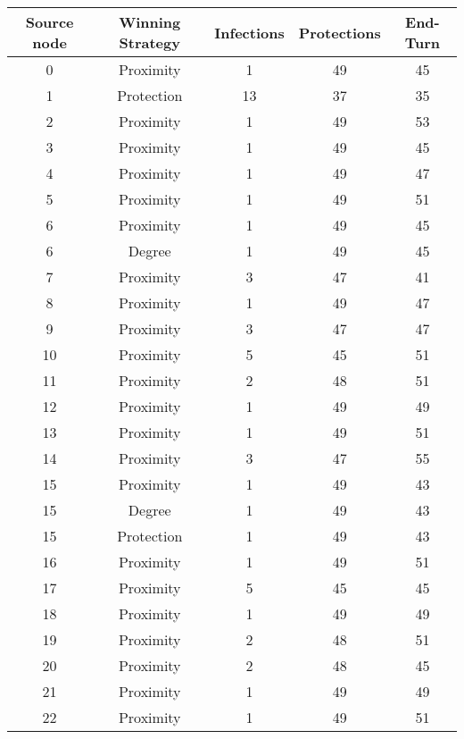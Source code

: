 \documentclass[results.tex]{subfiles}
\begin{document}
\begin{center}
  \begin{tabular}{| c || c | c | c | c |}
    \hline
    {\bfseries Source node} & {\bfseries Winning Strategy} & {\bfseries Infections} & {\bfseries Protections} & {\bfseries End-Turn} \\  %
    \hline\hline
    0 & Proximity & 1 & 49 & 45 \\ 
    \hline
    1 & Protection & 13 & 37 & 35 \\ 
    \hline
    2 & Proximity & 1 & 49 & 53 \\ 
    \hline
    3 & Proximity & 1 & 49 & 45 \\ 
    \hline
    4 & Proximity & 1 & 49 & 47 \\ 
    \hline
    5 & Proximity & 1 & 49 & 51 \\ 
    \hline
    6 & Proximity & 1 & 49 & 45 \\ 
    \hline
    6 & Degree & 1 & 49 & 45 \\ 
    \hline
    7 & Proximity & 3 & 47 & 41 \\ 
    \hline
    8 & Proximity & 1 & 49 & 47 \\ 
    \hline
    9 & Proximity & 3 & 47 & 47 \\ 
    \hline
    10 & Proximity & 5 & 45 & 51 \\ 
    \hline
    11 & Proximity & 2 & 48 & 51 \\ 
    \hline
    12 & Proximity & 1 & 49 & 49 \\ 
    \hline
    13 & Proximity & 1 & 49 & 51 \\ 
    \hline
    14 & Proximity & 3 & 47 & 55 \\ 
    \hline
    15 & Proximity & 1 & 49 & 43 \\ 
    \hline
    15 & Degree & 1 & 49 & 43 \\ 
    \hline
    15 & Protection & 1 & 49 & 43 \\ 
    \hline
    16 & Proximity & 1 & 49 & 51 \\ 
    \hline
    17 & Proximity & 5 & 45 & 45 \\ 
    \hline
    18 & Proximity & 1 & 49 & 49 \\ 
    \hline
    19 & Proximity & 2 & 48 & 51 \\ 
    \hline
    20 & Proximity & 2 & 48 & 45 \\ 
    \hline
    21 & Proximity & 1 & 49 & 49 \\ 
    \hline
    22 & Proximity & 1 & 49 & 51 \\ 

\end{tabular}
\end{center}
\end{document}
